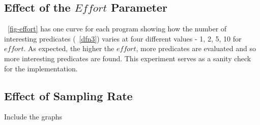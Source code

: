 \subsection{Effect of the $Effort$ Parameter}
~\autoref{fig-effort} has one curve for each program showing how the number of interesting predicates (~\autoref{dfn3}) varies at four different values - 1, 2, 5, 10 for $effort$.  As expected, the higher the $effort$, more predicates are evaluated and so more interesting predicates are found.  This experiment serves as a sanity check for the implementation.

\subsection{Effect of Sampling Rate}
Include the graphs